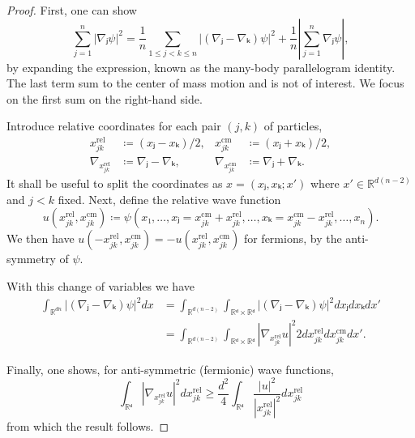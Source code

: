 \begin{proof}
  First, one can show
  \begin{equation}
    ∑_{j=1}^n |∇ⱼ ψ|^2 = \frac{1}{n} ∑_{1 \le j < k \le n} \left| (∇ⱼ - ∇ₖ) ψ \right|^2 + \frac{1}{n} \left| ∑_{j=1}^n ∇ⱼ ψ \right|,
  \end{equation}
  by expanding the expression, known as the many-body parallelogram identity. The last term sum to the center of mass motion and is not of interest. We focus on the first sum on the right-hand side.

  Introduce relative coordinates for each pair $(j,k)$ of particles,
  \begin{equation}
    \begin{aligned}
      x_{jk}^\text{rel} &≔ (xⱼ - xₖ)/2, & x_{jk}^\text{cm} &≔ (xⱼ + xₖ)/2, \\
      ∇_{x_{jk}^\text{rel}} &≔ ∇ⱼ - ∇ₖ, & ∇_{x_{jk}^\text{cm}} &≔ ∇ⱼ + ∇ₖ.
    \end{aligned}
  \end{equation}
  It shall be useful to split the coordinates as $x = (xⱼ, xₖ; x')$ where $x' ∈ ℝ^{d(n-2)}$ and $j < k$ fixed. Next, define the relative wave function
  \begin{equation}
    u(x_{jk}^\text{rel}, x_{jk}^\text{cm}) ≔ ψ(x₁, …, xⱼ=x_{jk}^\text{cm}+x_{jk}^\text{rel}, …, xₖ = x_{jk}^\text{cm}-x_{jk}^\text{rel}, …, x_n).
  \end{equation}
  We then have $u(-x_{jk}^\text{rel}, x_{jk}^\text{cm}) = -u(x_{jk}^\text{rel}, x_{jk}^\text{cm})$ for fermions, by the anti-symmetry of $ψ$.

  With this change of variables we have
  \begin{equation}
    \begin{aligned}
      ∫_{ℝ^{dn}} \left|(∇ⱼ-∇ₖ)ψ\right|^2 dx
      &= ∫_{ℝ^{d(n-2)}} ∫_{ℝᵈ \times ℝᵈ} \left|(∇ⱼ-∇ₖ)ψ\right|^2 dxⱼdxₖdx' \\
      &= ∫_{ℝ^{d(n-2)}} ∫_{ℝᵈ \times ℝᵈ} \left|∇_{x_{jk}^\text{rel}}u\right|^2  2 dx_{jk}^\text{rel}dx_{jk}^\text{cm} dx'.
    \end{aligned}
  \end{equation}

  Finally, one shows, for anti-symmetric (fermionic) wave functions,
  \begin{equation}
    ∫_{ℝᵈ} \left|∇_{x_{jk}^\text{rel}} u \right|^2 dx_{jk}^\text{rel} \ge \frac{d^2}{4} ∫_{ℝᵈ} \frac{|u|^2}{|x_{jk}^\text{rel}|^2} dx_{jk}^\text{rel}
  \end{equation}
  from which the result follows.
\end{proof}

